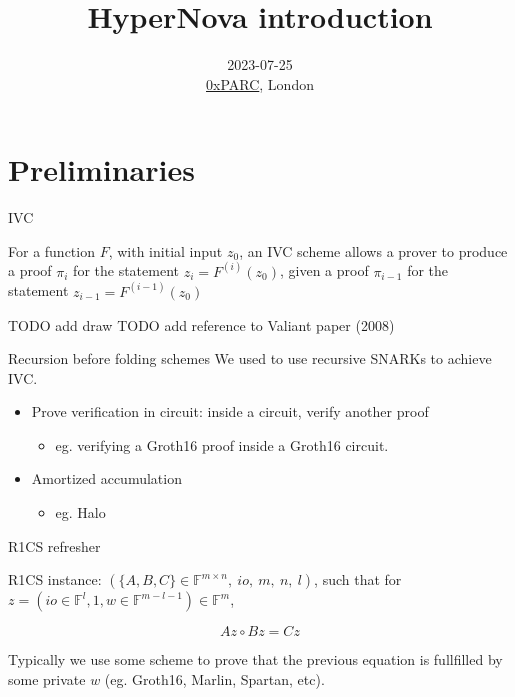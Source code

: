 \documentclass{beamer}
\title{HyperNova introduction}
\author{}
\date{\scriptsize{2023-07-25\\\href{https://0xparc.org}{0xPARC}, London}}
\begin{document}
\frame{\titlepage}




\section[Preliminaries]{Preliminaries}

\begin{frame}{IVC}

For a function $F$, with initial input $z_0$, an IVC scheme allows a prover to produce a proof $\pi_i$ for the statement $z_i = F^{(i)}(z_0)$, given a proof $\pi_{i-1}$ for the statement $z_{i-1} = F^{(i-1)}(z_0)$

TODO add draw
TODO add reference to Valiant paper (2008)

\end{frame}

\begin{frame}{Recursion before folding schemes}
We used to use recursive SNARKs to achieve IVC.

  \begin{itemize}
    \item Prove verification in circuit: inside a circuit, verify another proof
    \begin{itemize}
      \item eg. verifying a Groth16 proof inside a Groth16 circuit.
    \end{itemize}
    \item Amortized accumulation
    \begin{itemize}
      \item eg. Halo
    \end{itemize}
  \end{itemize}
\end{frame}

\begin{frame}{R1CS refresher}

  R1CS instance: $(\{A, B, C\} \in \mathbb{F}^{m \times n},~ io,~ m,~ n,~ l)$, such that for $z=(io \in \mathbb{F}^l, 1, w \in \mathbb{F}^{m-l-1}) \in \mathbb{F}^m$,

$$Az \circ Bz = Cz$$

Typically we use some scheme to prove that the previous equation is fullfilled by some private $w$ (eg. Groth16, Marlin, Spartan, etc).

\end{frame}
\end{document}
